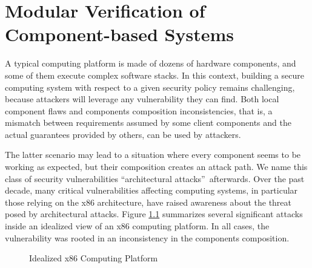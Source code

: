 \chapter{Modular Verification of Component-based Systems}
\label{chapter:freespec}


\vspace{1cm}\noindent
%
A typical computing platform is made of dozens of hardware components, and some
of them execute complex software stacks.
%
In this context, building a secure computing system with respect to a given
security policy remains challenging, because attackers will leverage any
vulnerability they can find.
%
Both local component flaws and components composition inconsistencies, that is,
a mismatch between requirements assumed by some client components and the actual
guarantees provided by others, can be used by attackers.

The latter scenario may lead to a situation where every component seems to be
working as expected, but their composition creates an attack path.
%
We name this class of security vulnerabilities ``architectural
attacks''\,\cite{letan2016speccert} afterwards.
%
Over the past decade, many critical vulnerabilities affecting computing systems,
in particular those relying on the x86 architecture, have raised awareness about
the threat posed by architectural attacks.
%
Figure \ref{fig:freespec:computing-platform} summarizes several significant
attacks\,\cite{wojtczuk2009smram,duflot2009smram,domas2015sinkhole,kallenberg2015racecondition,kovah2015senter,stewin2012dma}
inside an idealized view of an x86 computing platform.
%
In all cases, the vulnerability was rooted in an inconsistency in the components
composition.

\begin{figure}
  \centering 
  \caption{Idealized x86 Computing Platform}
  \label{fig:freespec:computing-platform}
\end{figure}

